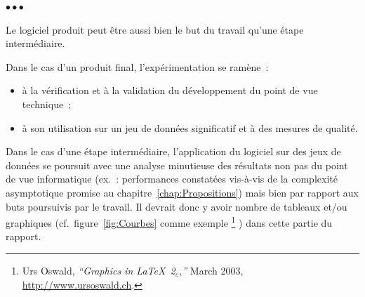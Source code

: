 \documentclass[11pt, french, screen, research-development]{report-rd-info}
\newenvironment{explanation}
{\color{blue}
 \begin{list}{}{\hspace{0.2\textwidth}\color{blue}}\item $\bullet\bullet\bullet$
}
{\end{list}}
\begin{document}
\begin{explanation}
   Le logiciel produit peut être aussi bien le but du travail qu'une étape intermédiaire.

   \bigskip

   Dans le cas d'un produit final, l'expérimentation se ramène~:
   \begin{itemize}
      \item à la vérification et à la validation du développement du point de vue technique~;
      \item à son utilisation sur un jeu de données significatif et à des mesures de qualité.
   \end{itemize}

   \bigskip

   Dans le cas d'une étape intermédiaire, l'application du logiciel sur des jeux de données se poursuit avec une analyse minutieuse des résultats non pas du point de vue informatique (ex.~: performances constatées vis-à-vis de la complexité asymptotique promise au chapitre~\ref{chap:Propositions}) mais bien par rapport aux buts poursuivis par le travail.
   Il devrait donc y avoir nombre de tableaux et/ou graphiques (cf.~figure~\ref{fig:Courbes} comme exemple%
   \footnote{Urs Oswald, \emph{``Graphics in \LaTeX\ 2$_\varepsilon$,''} March 2003, \url{http://www.ursoswald.ch}.}%
   ) dans cette partie du rapport.


\end{explanation}
\end{document}
